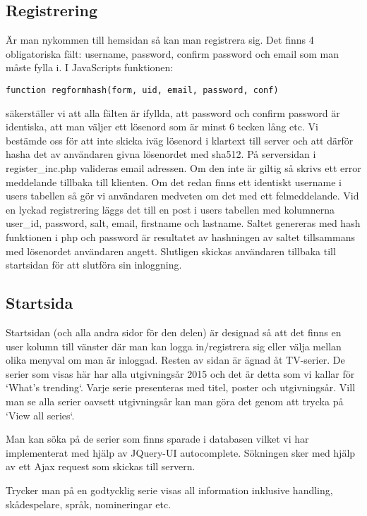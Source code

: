 \subsection{Registrering}
Är man nykommen till hemsidan så kan man registrera sig. Det finns 4 obligatoriska fält: username, password, confirm password och email som man måste fylla i. I JavaScripts funktionen:
\begin{lstlisting} 
function regformhash(form, uid, email, password, conf) 
\end{lstlisting}
säkerställer vi att alla fälten är ifyllda, att password och confirm password är identiska, att man väljer ett lösenord som är minst 6 tecken lång etc. Vi bestämde oss för att inte skicka iväg lösenord i klartext till server och att därför hasha det av användaren givna lösenordet med sha512. 
På serversidan i register\_inc.php valideras email adressen. Om den inte är giltig så skrivs ett error meddelande tillbaka till klienten. Om det redan finns ett identiskt username i users tabellen så gör vi användaren medveten om det med ett felmeddelande. Vid en lyckad registrering läggs det till en post i users tabellen med kolumnerna user\_id, password, salt, email, firstname och lastname. Saltet genereras med hash funktionen i php och password är resultatet av hashningen av saltet tillsammans med lösenordet användaren angett. Slutligen skickas användaren tillbaka till startsidan för att slutföra sin inloggning.


\subsection{Startsida}
Startsidan (och alla andra sidor för den delen) är designad så att det finns en user kolumn till vänster där man kan logga in/registrera sig eller välja mellan olika menyval om man är inloggad. Resten av sidan är ägnad åt TV-serier. De serier som visas här har alla utgivningsår 2015 och det är detta som vi kallar för `What's trending`. Varje serie presenteras med titel, poster och utgivningsår. Vill man se alla serier oavsett utgivningsår kan man göra det genom att trycka på `View all series`. 

Man kan söka på de serier som finns sparade i databasen vilket vi har implementerat med hjälp av JQuery-UI autocomplete. Sökningen sker med hjälp av ett Ajax request som skickas till servern.



Trycker man på en godtycklig serie visas all information inklusive handling, skådespelare, språk, nomineringar etc.

